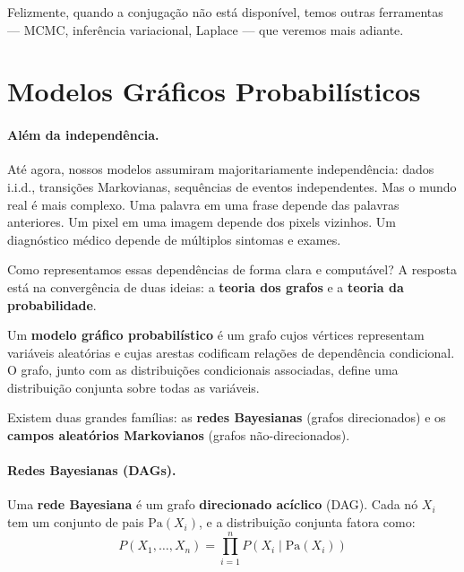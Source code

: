 \documentclass{tufte-handout}
\begin{document}
Felizmente, quando a conjugação não está disponível, temos outras ferramentas --- MCMC, inferência variacional, Laplace --- que veremos mais adiante.

\section{Modelos Gráficos Probabilísticos}

\paragraph{Além da independência.}

Até agora, nossos modelos assumiram majoritariamente independência: dados i.i.d., transições Markovianas, sequências de eventos independentes. Mas o mundo real é mais complexo. Uma palavra em uma frase depende das palavras anteriores. Um pixel em uma imagem depende dos pixels vizinhos. Um diagnóstico médico depende de múltiplos sintomas e exames.

Como representamos essas dependências de forma clara e computável? A resposta está na convergência de duas ideias: a \textbf{teoria dos grafos} e a \textbf{teoria da probabilidade}.

\begin{defn}
    Um \textbf{modelo gráfico probabilístico} é um grafo cujos vértices representam variáveis aleatórias e cujas arestas codificam relações de dependência condicional. O grafo, junto com as distribuições condicionais associadas, define uma distribuição conjunta sobre todas as variáveis.
\end{defn}

Existem duas grandes famílias: as \textbf{redes Bayesianas} (grafos direcionados) e os \textbf{campos aleatórios Markovianos} (grafos não-direcionados).

\paragraph{Redes Bayesianas (DAGs).}

Uma \textbf{rede Bayesiana} é um grafo \textbf{direcionado acíclico} (DAG). Cada nó $X_i$ tem um conjunto de pais $\text{Pa}(X_i)$, e a distribuição conjunta fatora como:
\[
P(X_1, \dots, X_n) = \prod_{i=1}^n P(X_i \mid \text{Pa}(X_i))
\]
\end{document}
